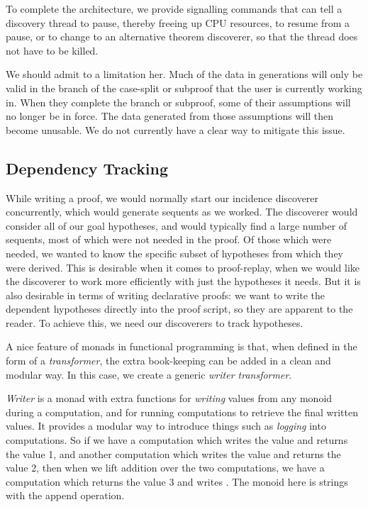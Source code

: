 To complete the architecture, we provide signalling commands that can tell a discovery thread to pause, thereby freeing up CPU resources, to resume from a pause, or to change to an alternative theorem discoverer, so that the thread does not have to be killed.

We should admit to a limitation her. Much of the data in generations will only be valid in the branch of the case-split or subproof that the user is currently working in. When they complete the branch or subproof, some of their assumptions will no longer be in force. The data generated from those assumptions will then become unusable. We do not currently have a clear way to mitigate this issue.


\subsection{Dependency Tracking}\label{sec:WriterMonad}
While writing a proof, we would normally start our incidence discoverer concurrently, which would generate sequents as we worked. The discoverer would consider all of our goal hypotheses, and would typically find a large number of sequents, most of which were not needed in the proof. Of those which were needed, we wanted to know the specific subset of hypotheses from which they were derived. This is desirable when it comes to proof-replay, when we would like the discoverer to work more efficiently with just the hypotheses it needs. But it is also desirable in terms of writing declarative proofs: we want to write the dependent hypotheses directly into the proof script, so they are apparent to the reader. To achieve this, we need our discoverers to track hypotheses.

A nice feature of monads in functional programming is that, when defined in the form of a \emph{transformer}, the extra book-keeping can be added in a clean and modular way. In this case, we create a generic \emph{writer transformer}.

\emph{Writer} is a monad with extra functions for \emph{writing} values from any monoid during a computation, and for running computations to retrieve the final written values. It provides a modular way to introduce things such as \emph{logging} into computations. So if we have a computation which writes the value  and returns the value 1, and another computation which writes the value  and returns the value 2, then when we lift addition over the two computations, we have a computation which returns the value 3 and writes . The monoid here is strings with the append operation.

